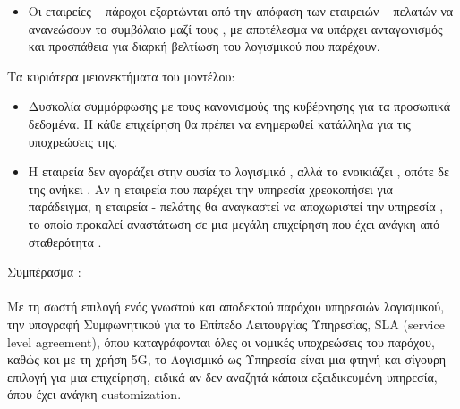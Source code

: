 \documentclass{article}
\begin{document}
\begin{itemize}
     SaaS, μια επιχείρηση έχει την ευκαιρία να αφοσιωθεί σε αυτό που την ενδιαφέρει πιο πολύ, την ποιότητα του προϊόντος της. Το ίδιο βέβαια ισχύει και για τους ιδιώτες. Αύξηση, λοιπόν, της καινοτομίας και της ευκινησίας (agility).
\item Οι εταιρείες – πάροχοι εξαρτώνται από την απόφαση των εταιρειών – πελατών να ανανεώσουν το συμβόλαιο μαζί τους , με αποτέλεσμα να υπάρχει ανταγωνισμός και προσπάθεια για διαρκή βελτίωση του λογισμικού που παρέχουν.
\end{itemize} 
Τα κυριότερα μειονεκτήματα του μοντέλου:
\begin{itemize}
  η χρήση Διαδικτύου, διαφορετικά δεν μπορεί να υπάρξει πρόσβαση στην εφαρμογή . Αντίθετα , με τον παραδοσιακό τρόπο του Λογισμικού ως Προϊόν , σε ορισμένες περιπτώσεις , ήταν εφικτό να γίνεται χρήση της εφαρμογής και χωρίς σύνδεση στο Διαδίκτυο . 
 ασφάλεια ευαίσθητων δεδομένων, αν δεν είναι έμπιστος ο πάροχος.
 ελέγχου, καθώς η υπηρεσία είναι έτοιμη για χρήση και δεν είναι εύκολο να μεταβληθεί και να προσαρμοστεί στις ανάγκες του κάθε χρήστη.
 ταχύτητα μετάδοσης της εφαρμογής, καθώς ο σέρβερ μπορεί να βρίσκεται σε μεγάλη απόσταση από το Browser, όπου τη χρησιμοποιεί ο χρήστης. Για αυτό είναι αναγκαία η επένδυση σε γρήγορη ταχύτητα Διαδικτύου.
\item Δυσκολία συμμόρφωσης με τους κανονισμούς της κυβέρνησης για τα προσωπικά δεδομένα. Η κάθε επιχείρηση θα πρέπει να ενημερωθεί κατάλληλα για τις υποχρεώσεις της.
\item Η εταιρεία δεν αγοράζει στην ουσία το λογισμικό , αλλά το ενοικιάζει , οπότε δε της ανήκει . Αν η εταιρεία που παρέχει την υπηρεσία χρεοκοπήσει για παράδειγμα, η εταιρεία - πελάτης θα αναγκαστεί να αποχωριστεί την υπηρεσία , το οποίο προκαλεί αναστάτωση σε μια μεγάλη επιχείρηση που έχει ανάγκη από σταθερότητα .

\end{itemize}
Συμπέρασμα : \\ \\
Με τη σωστή επιλογή ενός γνωστού και αποδεκτού παρόχου υπηρεσιών λογισμικού, την υπογραφή Συμφωνητικού για το Επίπεδο Λειτουργίας Υπηρεσίας, SLA (service level agreement), όπου καταγράφονται όλες οι νομικές υποχρεώσεις του παρόχου, καθώς και με τη χρήση  5G, το Λογισμικό ως Υπηρεσία είναι μια φτηνή και σίγουρη επιλογή για μια επιχείρηση, ειδικά αν δεν αναζητά κάποια εξειδικευμένη υπηρεσία, όπου έχει ανάγκη  customization.
\end{document}
